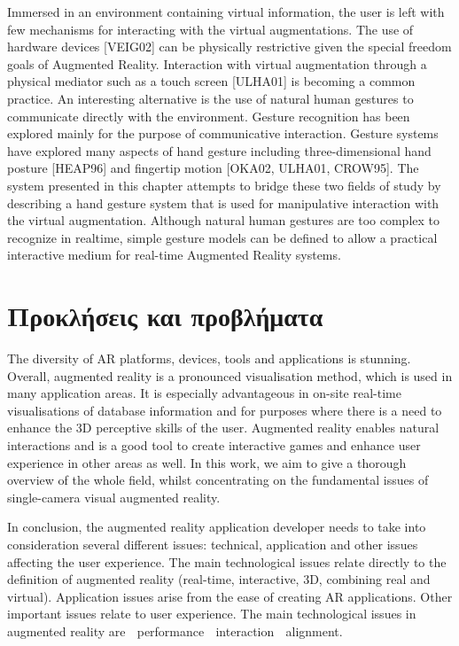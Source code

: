 Immersed in an environment containing virtual information, the user is left with few mechanisms for interacting with the virtual augmentations. The use of hardware devices [VEIG02] can be physically restrictive given the special freedom goals of Augmented Reality. Interaction with virtual augmentation through a physical mediator such as a touch screen [ULHA01] is becoming a common practice. An interesting alternative is the use of natural human gestures to communicate directly with the environment. Gesture recognition has been explored mainly for the purpose of communicative interaction. Gesture systems have explored many aspects of hand gesture including three-dimensional hand posture [HEAP96] and fingertip motion [OKA02, ULHA01, CROW95]. The system presented in this chapter attempts to bridge these two fields of study by describing a hand gesture system that is used for manipulative interaction with the virtual augmentation. Although natural human gestures are too complex to recognize in realtime, simple gesture models can be defined to allow a practical interactive medium for real-time Augmented Reality systems.

\section{Προκλήσεις και προβλήματα}

The diversity of AR platforms, devices, tools and applications is stunning. Overall,
augmented reality is a pronounced visualisation method, which is used in many
application areas. It is especially advantageous in on-site real-time visualisations
of database information and for purposes where there is a need to enhance the
3D perceptive skills of the user. Augmented reality enables natural interactions
and is a good tool to create interactive games and enhance user experience in
other areas as well. In this work, we aim to give a thorough overview of the whole
field, whilst concentrating on the fundamental issues of single-camera visual augmented
reality.


In conclusion, the augmented reality application developer needs to take into consideration several different issues: technical, application and other issues affecting the user experience. The main technological issues relate directly to the definition of augmented reality (real-time, interactive, 3D, combining real and virtual). Application issues arise from the ease of creating AR applications. Other important issues relate to user experience. The main technological issues in augmented reality are 􀁸 performance 􀁸 interaction 􀁸 alignment.

